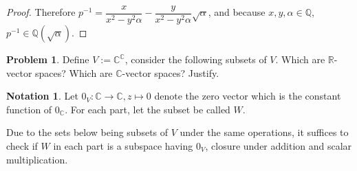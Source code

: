 \documentclass{article}
\theoremstyle{definition}
\newtheorem{problem}{Problem}
\newtheorem*{notation}{Notation}
\numberwithin{equation}{problem}
\newcommand{\R}{\mathbb{R}}
\newcommand{\Q}{\mathbb{Q}}
\newcommand{\C}{\mathbb{C}}
\renewcommand{\vec}[1]{\mathit{#1}_V}
\begin{document}
\begin{proof}
    Therefore $p^{-1} = \dfrac{x}{x^2 - y^2 \alpha} - \dfrac{y}{x^2 - y^2 \alpha} \sqrt{\alpha}$,
    and because $x,y,\alpha \in \Q$, $p^{-1} \in \Q(\sqrt{\alpha})$.
\end{proof}

\begin{problem}
    Define $V := \C^\C$, consider the following subsets of $V$.
    Which are $\R$-vector spaces? Which are $\C$-vector spaces? Justify.
\end{problem}

\begin{notation}
    Let $\vec{0} : \C \to \C, z \mapsto 0$ denote the zero vector which is the constant function of $0_\C$.
    For each part, let the subset be called $W$.
\end{notation}
Due to the sets below being subsets of $V$ under the same operations,
it suffices to check if $W$ in each part is a subspace
having $\vec{0}$, closure under addition and scalar multiplication.
\end{document}
